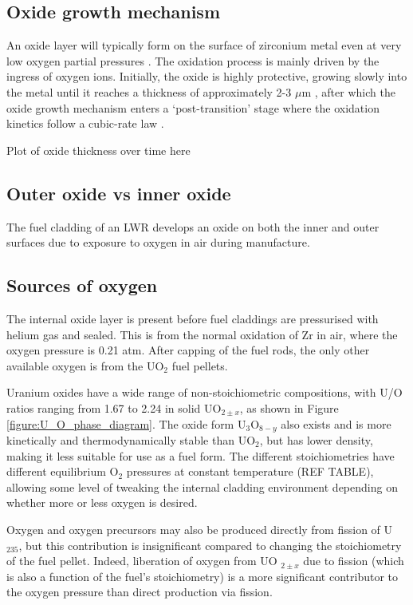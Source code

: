 \subsection{Oxide growth mechanism}

An oxide layer will typically form on the surface of zirconium metal even at very low oxygen partial pressures \cite{causey2005review}. The oxidation process is mainly driven by the ingress of oxygen ions. Initially, the oxide is highly protective, growing slowly into the metal until it reaches a thickness of approximately 2-3 $\mu$m \cite{garzarolli1991oxide,dawson1968kinetics}, after which the oxide growth mechanism enters a `post-transition' stage where the oxidation kinetics follow a cubic-rate law  \cite{porte1960oxidation}.

Plot of oxide thickness over time here

\subsection{Outer oxide vs inner oxide}
The fuel cladding of an LWR develops an oxide on both the inner and outer surfaces due to exposure to oxygen in air during manufacture. 

\subsection{Sources of oxygen}

The internal oxide layer is present before fuel claddings are pressurised with helium gas and sealed. This is from the normal oxidation of Zr in air, where the oxygen pressure is 0.21 atm. After capping of the fuel rods, the only other available oxygen is from the UO$_{2}$ fuel pellets.

Uranium oxides have a wide range of non-stoichiometric compositions, with U/O ratios ranging from 1.67 to 2.24 in solid UO$_{2 \pm x}$, as shown in Figure \ref{figure:U_O_phase_diagram}. The oxide form U$_{3}$O$_{8-y}$ also exists and is more kinetically and thermodynamically stable than UO$_{2}$, but has lower density, making it less suitable for use as a fuel form. The different stoichiometries have different equilibrium O$_{2}$ pressures at constant temperature (REF TABLE), allowing some level of tweaking the internal cladding environment depending on whether more or less oxygen is desired. 

Oxygen and oxygen precursors may also be produced directly from fission of U
$_{235}$, but this contribution is insignificant compared to changing the stoichiometry of the fuel pellet. Indeed, liberation of oxygen from UO
$_{2 \pm x}$ due to fission (which is also a function of the fuel's stoichiometry) is a more significant contributor to the oxygen pressure than direct production via fission.

